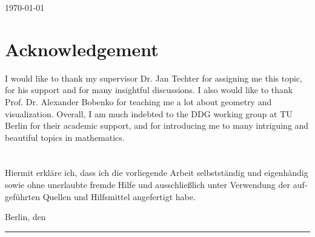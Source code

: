 \documentclass[10pt, a4paper]{article}
\theoremstyle{BoldTopSpacing}
\theoremstyle{BoldTopSpacing}
\theoremstyle{BoldTopSpacing}
\theoremstyle{BoldTopBottomSpacing}
\theoremstyle{BoldTopSpacing}
\theoremstyle{BoldTopBottomSpacing}
\theoremstyle{remark}
\begin{document}
\begin{titlepage}
\begin{center}
\vspace{260 pt}
{\large\today}
\end{center}
\end{titlepage}
\pagestyle{fancy}
\section*{Acknowledgement}
I would like to thank my supervisor Dr. Jan Techter for assigning me this topic, for his support and for many insightful discussions. I also would like to thank Prof. Dr. Alexander Bobenko for teaching me a lot about geometry and visualization. Overall, I am much indebted to the DDG working group at TU Berlin for their academic support, and for introducing me to many intriguing and beautiful topics in mathematics. \par
\pagebreak

\section*{}
\begin{otherlanguage}{german}
Hiermit erkl\"are ich, dass ich die vorliegende Arbeit selbstst\"andig und eigenh\"andig sowie ohne unerlaubte fremde Hilfe und ausschließlich unter Verwendung der aufgef\"uhrten Quellen und Hilfsmittel angefertigt habe. \par
Berlin, den \hrule
\end{otherlanguage}
\pagebreak
\pagestyle{tocstyle}
\renewcommand{\contentsname}{Contents}
\tableofcontents
\pagebreak
\listoffigures
\pagebreak
\pagestyle{fancy}
\end{document}
